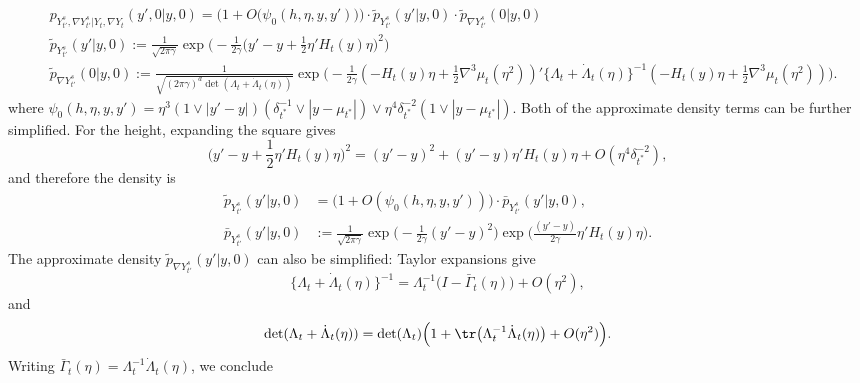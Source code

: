 \documentclass{article}
\begin{document}
	\begin{align*}
		& p_{Y_{t'}^s, \nabla Y_{t'}^s|Y_t,\nabla Y_t}(y',0|y,0) 
		= 
		\Big(1 + O\big(\psi_0(h,\eta,y,y')\big)\Big) \cdot \tilde{p}_{Y_{t'}^s}(y'|y,0) \cdot \tilde{p}_{\nabla Y_{t'}^s}(0|y,0) \\
		& \tilde{p}_{Y_{t'}^s}(y'|y,0) 
		:= 
		\frac{1}{\sqrt{2 \pi \gamma}} \exp\Big(-\frac{1}{2\gamma}\big(y' - y + \frac{1}{2}\eta'H_t(y)\eta\big)^2\Big) \\
		& \tilde{p}_{\nabla Y_{t'}^s}(0|y,0) 
		:= 
		\frac{1}{\sqrt{(2 \pi \gamma)^d \det(\Lambda_t + \dot{\Lambda}_t(\eta))}} \exp\Big(-\frac{1}{2\gamma}(-H_t(y)\eta + \frac{1}{2}\nabla^3\mu_t(\eta^2))'\{\Lambda_t + \dot{\Lambda}_t(\eta)\}^{-1}(-H_t(y)\eta + \frac{1}{2}\nabla^3\mu_t(\eta^2))\Big).
	\end{align*}
	where $\psi_0(h,\eta,y,y') = \eta^3(1 \vee |y' - y|)(\delta_{t^*}^{-1} \vee |y - \mu_{t^*}|) \vee \eta^4 \delta_{t^*}^{-2}(1 \vee |y - \mu_{t^*}|)$. Both of the approximate density terms can be further simplified. For the height, expanding the square gives
	\begin{equation*}
		\big(y' - y + \frac{1}{2}\eta'H_t(y)\eta\big)^2
		= (y' - y)^2 + (y' - y)\eta'H_t(y)\eta + O(\eta^4 \delta_{t^*}^{-2}),
	\end{equation*}
	and therefore the density is 
	\begin{equation}
		\label{eqn:randomized-kac-rice-density-height}
		\begin{aligned}
			\tilde{p}_{Y_{t'}^s}(y'|y,0) 
			& = \big(1 + O(\psi_0(h,\eta,y,y'))\big) \cdot \bar{p}_{Y_{t'}^s}(y'|y,0),  \\
			\bar{p}_{Y_{t'}^s}(y'|y,0) 
			& := \frac{1}{\sqrt{2 \pi \gamma}}\exp\Big(-\frac{1}{2\gamma}(y' - y)^2\Big)\exp\Big(\frac{(y' - y)}{2\gamma}\eta'H_t(y)\eta\Big).
		\end{aligned}
	\end{equation} 
	The approximate density $\tilde{p}_{\nabla Y_{t'}^s}(y'|y,0)$ can also be simplified: Taylor expansions give
	\begin{equation*}
		\{\Lambda_t + \dot{\Lambda}_t(\eta)\}^{-1} = \Lambda_t^{-1}\big(I - \bar{\Gamma}_{t}(\eta)\big) + O(\eta^2),
	\end{equation*}
	and
	\begin{equation*}
		\det(\Lambda_t + \dot{\Lambda}_t(\eta)) = \det(\Lambda_t)\Big(1 + \tr\big(\Lambda_t^{-1}\dot{\Lambda}_{t}(\eta)\big) + O(\eta^2)\Big).
	\end{equation*}
	Writing $\bar{\Gamma}_t(\eta) = \Lambda_t^{-1}\dot{\Lambda}_t(\eta)$, we conclude
\end{document}
